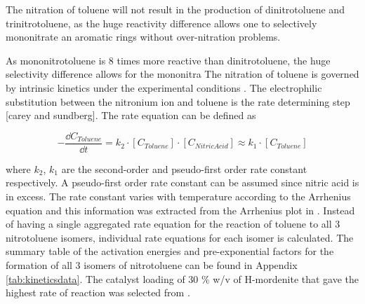 The nitration of toluene will not result in the production of dinitrotoluene and trinitrotoluene, as the huge reactivity difference allows one to selectively mononitrate an aromatic rings without over-nitration problems. 

As mononitrotoluene is 8 times more reactive than dinitrotoluene, the huge selectivity difference allows for the mononitra
The nitration of toluene is governed by intrinsic kinetics under the experimental conditions \cite{jeeru_kinetics_2018}. The electrophilic substitution between the  nitronium ion and toluene is the rate determining step [carey and sundberg]. The rate equation can be defined as  

\begin{equation}
-\frac{\dd C_{Toluene}}{\dd t} = k_{2} \cdot [C_{Toluene}] \cdot [C_{Nitric Acid}] \approx k_{1} \cdot [C_{Toluene}]
\end{equation}

where $k_2$, $k_1$ are the second-order and pseudo-first order rate constant respectively. A pseudo-first order rate constant can be assumed since nitric acid is in excess. The rate constant varies with temperature according to the Arrhenius equation and this information was extracted from the Arrhenius plot in \textcite{jeeru_kinetics_2018}. Instead of having a single aggregated rate equation for the reaction of toluene to all 3 nitrotoluene isomers, individual rate equations for each isomer is calculated. The summary table of the activation energies and pre-exponential factors for the formation of all 3 isomers of nitrotoluene can be found in Appendix \ref{tab:kineticsdata}. The catalyst loading of 30 \% w/v of H-mordenite that gave the highest rate of reaction was selected from \textcite{jeeru_kinetics_2018}.




